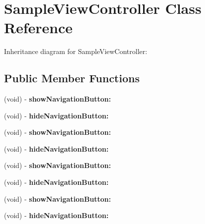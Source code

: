 \hypertarget{interface_sample_view_controller}{
\section{\-Sample\-View\-Controller \-Class \-Reference}
\label{interface_sample_view_controller}
}


\-Inheritance diagram for \-Sample\-View\-Controller\-:
\subsection*{\-Public \-Member \-Functions}
\begin{DoxyCompactItemize}
\item 
\hypertarget{interface_sample_view_controller_aaa542153e43b7651cd7b936391552a3a}{
(void) -\/ {\bfseries show\-Navigation\-Button\-:}}
\label{interface_sample_view_controller_aaa542153e43b7651cd7b936391552a3a}

\item 
\hypertarget{interface_sample_view_controller_a87efd4df8a56c73a169ba46e627ea393}{
(void) -\/ {\bfseries hide\-Navigation\-Button\-:}}
\label{interface_sample_view_controller_a87efd4df8a56c73a169ba46e627ea393}

\item 
\hypertarget{interface_sample_view_controller_aaa542153e43b7651cd7b936391552a3a}{
(void) -\/ {\bfseries show\-Navigation\-Button\-:}}
\label{interface_sample_view_controller_aaa542153e43b7651cd7b936391552a3a}

\item 
\hypertarget{interface_sample_view_controller_a87efd4df8a56c73a169ba46e627ea393}{
(void) -\/ {\bfseries hide\-Navigation\-Button\-:}}
\label{interface_sample_view_controller_a87efd4df8a56c73a169ba46e627ea393}

\item 
\hypertarget{interface_sample_view_controller_aaa542153e43b7651cd7b936391552a3a}{
(void) -\/ {\bfseries show\-Navigation\-Button\-:}}
\label{interface_sample_view_controller_aaa542153e43b7651cd7b936391552a3a}

\item 
\hypertarget{interface_sample_view_controller_a87efd4df8a56c73a169ba46e627ea393}{
(void) -\/ {\bfseries hide\-Navigation\-Button\-:}}
\label{interface_sample_view_controller_a87efd4df8a56c73a169ba46e627ea393}

\item 
\hypertarget{interface_sample_view_controller_aaa542153e43b7651cd7b936391552a3a}{
(void) -\/ {\bfseries show\-Navigation\-Button\-:}}
\label{interface_sample_view_controller_aaa542153e43b7651cd7b936391552a3a}

\item 
\hypertarget{interface_sample_view_controller_a87efd4df8a56c73a169ba46e627ea393}{
(void) -\/ {\bfseries hide\-Navigation\-Button\-:}}
\label{interface_sample_view_controller_a87efd4df8a56c73a169ba46e627ea393}

\end{DoxyCompactItemize}
